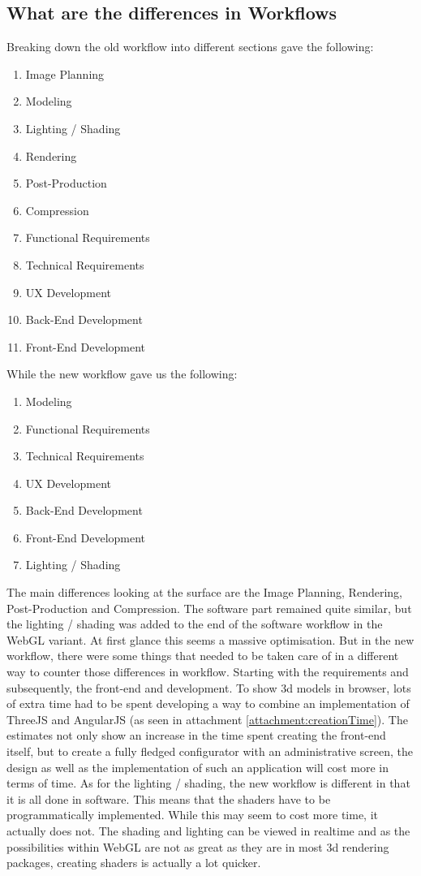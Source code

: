\subsection {What are the differences in Workflows}
\label{subsub:differencesInWorkflow}
Breaking down the old workflow into different sections gave the following:
\begin{enumerate}
	\item {Image Planning}
	\item {Modeling}
	\item {Lighting / Shading}
	\item {Rendering}
	\item {Post-Production}
	\item {Compression}
	\item {Functional Requirements}
	\item {Technical Requirements}
	\item {UX Development}
	\item {Back-End Development}
	\item {Front-End Development}
\end{enumerate}

While the new workflow gave us the following:
\begin{enumerate}
	\item {Modeling}
	\item {Functional Requirements}
	\item {Technical Requirements}
	\item {UX Development}
	\item {Back-End Development}
	\item {Front-End Development}
	\item {Lighting / Shading}
\end{enumerate}

The main differences looking at the surface are the Image Planning, Rendering, Post-Production and Compression. The software part remained quite similar, but the lighting / shading was added to the end of the software workflow in the WebGL variant. At first glance this seems a massive optimisation. But in the new workflow, there were some things that needed to be taken care of in a different way to counter those differences in workflow. Starting with the requirements and subsequently, the front-end and development. To show 3d models in browser, lots of extra time had to be spent developing a way to combine an implementation of ThreeJS and AngularJS (as seen in attachment \ref{attachment:creationTime}). The estimates not only show an increase in the time spent creating the front-end itself, but to create a fully fledged configurator with an administrative screen, the design as well as the implementation of such an application will cost more in terms of time.\newline
As for the lighting / shading, the new workflow is different in that it is all done in software. This means that the shaders have to be programmatically implemented. While this may seem to cost more time, it actually does not. The shading and lighting can be viewed in realtime and as the possibilities within WebGL are not as great as they are in most 3d rendering packages, creating shaders is actually a lot quicker.

